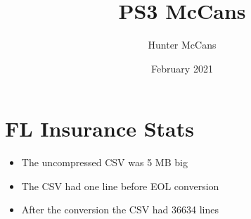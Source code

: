 \documentclass{article}
\title{PS3 McCans}
\author{Hunter McCans}
\date{February 2021}
\begin{document}
\maketitle

\section{FL Insurance Stats}

\begin{itemize}
    \item The uncompressed CSV was 5 MB big
    \item The CSV had one line before EOL conversion
    \item After the conversion the CSV had 36634 lines
\end{itemize}
\end{document}
